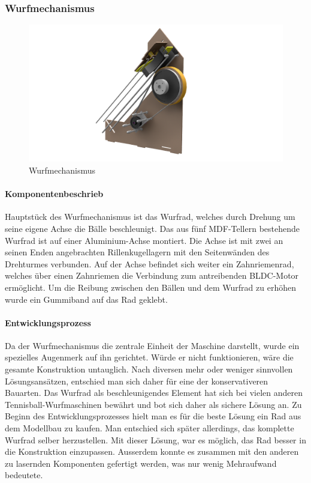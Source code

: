 \subsubsection{Wurfmechanismus}
\begin{figure}[h!]
	\centering
	\includegraphics[width=\linewidth]{../../fig/Wurfmechanismus}
	\caption{Wurfmechanismus}
	\label{fig:Wurfmechanismus}
\end{figure}
\paragraph{Komponentenbeschrieb\\}
Hauptstück des Wurfmechanismus ist das Wurfrad, welches durch Drehung um seine eigene Achse die Bälle beschleunigt.
Das aus fünf MDF-Tellern bestehende Wurfrad ist auf einer  Aluminium-Achse montiert. Die Achse ist mit zwei an seinen Enden angebrachten Rillenkugellagern mit den Seitenwänden des Drehturmes verbunden. Auf der Achse befindet sich weiter ein Zahnriemenrad, welches über einen Zahnriemen die Verbindung zum antreibenden BLDC-Motor ermöglicht.
Um die Reibung zwischen den Bällen und dem Wurfrad zu erhöhen wurde ein Gummiband auf das Rad geklebt.

\paragraph{Entwicklungsprozess\\}
Da der Wurfmechanismus die zentrale Einheit der Maschine darstellt, wurde ein spezielles Augenmerk auf ihn gerichtet. Würde er nicht funktionieren, wäre die gesamte Konstruktion untauglich. Nach diversen mehr oder weniger sinnvollen Lösungsansätzen, entschied man sich daher für eine der konservativeren Bauarten.
Das Wurfrad als beschleunigendes Element hat sich bei vielen anderen Tennisball-Wurfmaschinen bewährt und bot sich daher als sichere Lösung an.
Zu Beginn des Entwicklungsprozesses hielt man es für die beste Lösung ein Rad aus dem Modellbau zu kaufen. Man entschied sich später allerdings, das komplette Wurfrad selber herzustellen. Mit dieser Lösung, war es möglich, das Rad besser in die Konstruktion einzupassen. Ausserdem konnte es zusammen mit den anderen zu lasernden Komponenten gefertigt werden, was nur wenig Mehraufwand bedeutete.